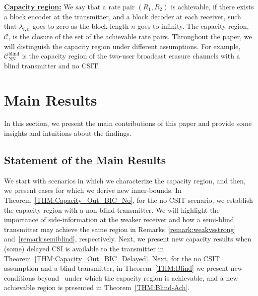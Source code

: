 \documentclass[journal,12pt,draftcls,onecolumn]{IEEEtran}
\begin{document}
\noindent \underline{\bf Capacity region:} We say that a rate pair $(R_1,R_2)$ is achievable, if there exists a block encoder at the transmitter, and a block decoder at each receiver, such that $\lambda_{i,n}$ goes to zero as the block length $n$ goes to infinity. The capacity region, $\mathcal{C}$, is the closure of the set of the achievable rate pairs. Throughout the paper, we will distinguish the capacity region under different assumptions. For example, $\mathcal{C}^{\mathrm{blind}}_{\mathrm{NN}}$ is the capacity region of the two-user broadcast erasure channels with a blind transmitter and no CSIT.



\section{Main Results}
\label{Section:Main_BIC}

In this section, we present the main contributions of this paper and provide some insights and intuitions about the findings.

\subsection{Statement of the Main Results}

We start with scenarios in which we characterize the capacity region, and then, we present cases for which we derive new inner-bounds. In Theorem~\ref{THM:Capacity_Out_BIC_No}, for the no CSIT scenario, we establish the capacity region with a non-blind transmitter. We will highlight the importance of side-information at the weaker receiver and how a semi-blind transmitter may achieve the same region in Remarks~\ref{remark:weakvsstrong} and~\ref{remark:semiblind}, respectively. Next, we present new capacity results when (some) delayed CSI is available to the transmitter in Theorem~\ref{THM:Capacity_Out_BIC_Delayed}. Next, for the no CSIT assumption and a blind transmitter, in Theorem~\ref{THM:Blind} we present new conditions beyond~\cite{kao2016blind} under which the capacity region is achievable, and a new achievable region is presented in Theorem~\ref{THM:Blind-Ach}.

\end{document}
